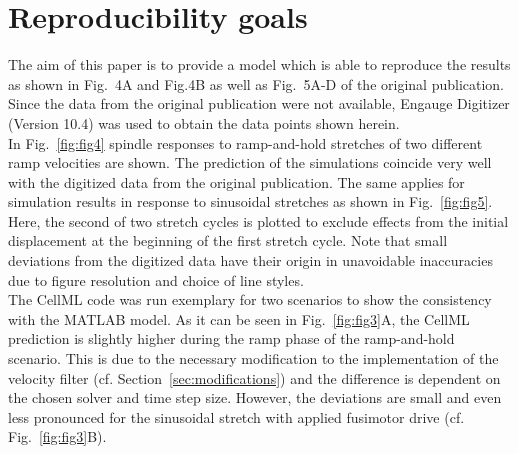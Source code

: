 \documentclass[fleqn,10pt]{physiome}
\begin{document}
\section{Reproducibility goals}\label{sec:reprod}
The aim of this paper is to provide a model which is able to reproduce the results as shown in Fig.~4A and Fig.4B as well as Fig.~5A-D of the original publication. 
Since the data from the original publication were not available, Engauge Digitizer (Version 10.4) was used to obtain the data points shown herein.\\
In Fig.~\ref{fig:fig4} spindle responses to ramp-and-hold stretches of two different ramp velocities are shown.
The prediction of the simulations coincide very well with the digitized data from the original publication. 
The same applies for simulation results in response to sinusoidal stretches as shown in Fig.~\ref{fig:fig5}.
Here, the second of two stretch cycles is plotted to exclude effects from the initial displacement at the beginning of the first stretch cycle. 
Note that small deviations from the digitized data have their origin in unavoidable inaccuracies due to figure resolution and choice of line styles. \\
The CellML code was run exemplary for two scenarios to show the consistency with the MATLAB model. 
As it can be seen in Fig.~\ref{fig:fig3}A, the CellML prediction is slightly higher during the ramp phase of the ramp-and-hold scenario. 
This is due to the necessary modification to the implementation of the velocity filter (cf. Section~\ref{sec:modifications}) and the difference is  dependent on the chosen solver and time step size. 
However, the deviations are  small and even less pronounced for the sinusoidal stretch with applied fusimotor drive (cf. Fig.~\ref{fig:fig3}B).
\end{document}
